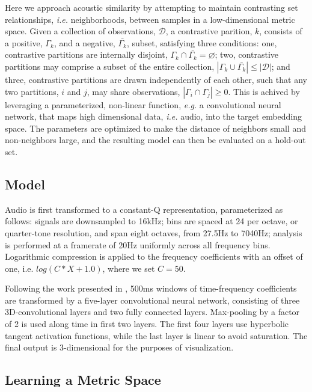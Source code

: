 \documentclass{article}
\begin{document}
Here we approach acoustic similarity by attempting to maintain contrasting set relationships, \emph{i.e.} neighborhoods, between samples in a low-dimensional metric space.
Given a collection of observations, $\mathcal{D}$, a contrastive parition, $k$, consists of a positive, $\Gamma_k$, and a negative, $\bar{\Gamma_k}$, subset, satisfying three conditions:
one, contrastive partitions are internally disjoint, $\Gamma_k \cap \bar{\Gamma_k} = \varnothing$;
two, contrastive partitions may comprise a subset of the entire collection, $|\Gamma_k \cup \bar{\Gamma_k}| \le |\mathcal{D}|$;
and three, contrastive partitions are drawn independently of each other, such that any two partitions, $i$ and $j$, may share observations, $|\Gamma_i \cap \Gamma_j| \ge 0$.
This is achived by leveraging a parameterized, non-linear function, \emph{e.g.} a convolutional neural network, that maps high dimensional data, \emph{i.e.} audio, into the target embedding space.
The parameters are optimized to make the distance of neighbors small and non-neighbors large, and the resulting model can then be evaluated on a hold-out set.


\subsection{Model}

Audio is first transformed to a constant-Q representation, parameterized as follows:
signals are downsampled to 16kHz;
bins are spaced at 24 per octave, or quarter-tone resolution, and span eight octaves, from 27.5Hz to 7040Hz;
analysis is performed at a framerate of 20Hz uniformly across all frequency bins.
Logarithmic compression is applied to the frequency coefficients with an offset of one, i.e. $log(C*X + 1.0)$, where we set $C=50$.

Following the work presented in \cite{humphrey2015dl4mir}, 500ms windows of time-frequency coefficients are transformed by a five-layer convolutional neural network, consisting of three 3D-convolutional layers and two fully connected layers.
Max-pooling by a factor of 2 is used along time in first two layers.
The first four layers use hyperbolic tangent activation functions, while the last layer is linear to avoid saturation.
The final output is 3-dimensional for the purposes of visualization.


\subsection{Learning a Metric Space}
\end{document}
